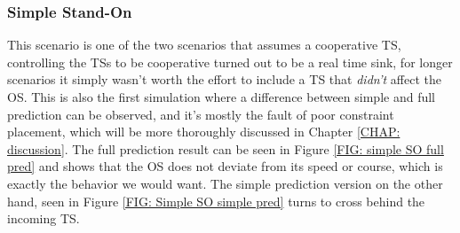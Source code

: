 \subsubsection{Simple Stand-On}
This scenario is one of the two scenarios that assumes a cooperative TS, controlling the TSs to be cooperative turned out to be a real time sink, for longer scenarios
it simply wasn't worth the effort to include a TS that \textit{didn't} affect the OS.
This is also the first simulation where a difference between simple and full
prediction can be observed, and it's mostly the fault of poor constraint placement, which will be more thoroughly 
discussed in Chapter \ref{CHAP: discussion}. The full prediction result can be seen in
Figure \ref{FIG: simple SO full pred} and shows that the OS does not deviate from its speed or course, which is exactly the behavior we would want. 
The simple prediction version on the other hand, seen in Figure \ref{FIG: Simple SO simple pred} turns to cross behind the incoming TS.

